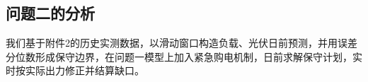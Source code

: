 \subsection{问题二的分析}

我们基于附件2的历史实测数据，以滑动窗口构造负载、光伏日前预测，并用误差分位数形成保守边界，在问题一模型上加入紧急购电机制，日前求解保守计划，实时按实际出力修正并结算缺口。


